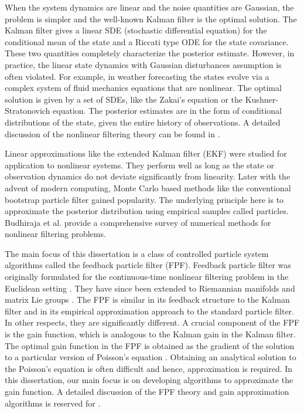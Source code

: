 When the system dynamics are linear and the noise quantities are Gaussian, the problem is simpler and the well-known Kalman filter is the optimal solution. The Kalman filter gives a linear SDE (stochastic differential equation) for the conditional mean of the state and a Riccati type ODE for the state covariance. These two quantities completely characterize the posterior estimate. However, in practice, the linear state dynamics with Gaussian disturbances assumption is often violated.  For example, in weather forecasting the states evolve via a complex system of fluid mechanics equations that are nonlinear. The optimal solution is given by a set of SDEs, like the Zakai's equation or the Kushner-Stratonovich equation. The posterior estimates are in the form of conditional distributions of the state, given the entire history of observations. A detailed discussion of the nonlinear filtering theory can be found in \cite{baicri08}. 

Linear approximations like the extended Kalman filter (EKF) were studied for application to nonlinear systems. They perform well as long as the state or observation dynamics do not deviate significantly from linearity. Later with the advent of modern computing, Monte Carlo based methods like the conventional bootstrap particle filter gained popularity. The underlying principle here is to approximate the posterior distribution using empirical samples called particles. Budhiraja et al. \cite{budchelee07} provide a comprehensive survey of numerical methods for nonlinear filtering problems. 

The main focus of this dissertation is a class of controlled particle system algorithms called the feedback particle filter (FPF). Feedback particle filter was originally formulated for the continuous-time nonlinear filtering problem in the Euclidean setting \cite{yanmehmey13}. They have since been extended to Riemannian manifolds and matrix Lie groups \cite{zhatagmeh16}. The FPF is similar in its feedback structure to the Kalman filter and in its empirical approximation approach to the standard particle filter. In other respects, they are significantly different. A crucial component of the FPF is the gain function, which is analogous to the Kalman gain in the Kalman filter. The optimal gain function in the FPF is obtained as the gradient of the solution to a particular version of Poisson's equation \cite{yanmehmey13, laumehmeyrag14}. Obtaining an analytical solution to the Poisson's equation is often difficult and hence, approximation is required. In this dissertation, our main focus is on developing algorithms to approximate the gain function. A detailed discussion of the FPF theory and gain approximation algorithms is reserved for . 


